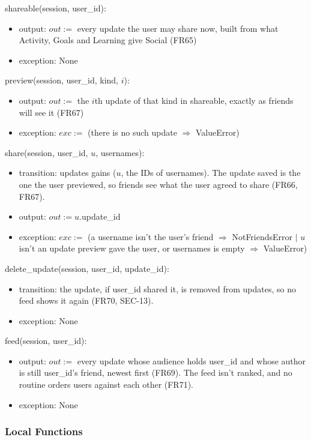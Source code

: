 \documentclass[12pt, titlepage]{article}
\begin{document}
\noindent shareable(session, user\_id):
\begin{itemize}
\item output: $out :=$ every update the user may share now, built from what
  Activity, Goals and Learning give Social (FR65)
\item exception: None
\end{itemize}

\noindent preview(session, user\_id, kind, $i$):
\begin{itemize}
\item output: $out :=$ the $i$th update of that kind in shareable, exactly as
  friends will see it (FR67)
\item exception: $exc :=$ (there is no such update $\Rightarrow$ ValueError)
\end{itemize}

\noindent share(session, user\_id, $u$, usernames):
\begin{itemize}
\item transition: updates gains ($u$, the IDs of usernames). The update saved
  is the one the user previewed, so friends see what the user agreed to share
  (FR66, FR67).
\item output: $out := u$.update\_id
\item exception: $exc :=$ (a username isn't the user's friend $\Rightarrow$
  NotFriendsError $|$ $u$ isn't an update preview gave the user, or usernames
  is empty $\Rightarrow$ ValueError)
\end{itemize}

\noindent delete\_update(session, user\_id, update\_id):
\begin{itemize}
\item transition: the update, if user\_id shared it, is removed from updates,
  so no feed shows it again (FR70, SEC-13).
\item exception: None
\end{itemize}

\noindent feed(session, user\_id):
\begin{itemize}
\item output: $out :=$ every update whose audience holds user\_id and whose
  author is still user\_id's friend, newest first (FR69). The feed isn't
  ranked, and no routine orders users against each other (FR71).
\item exception: None
\end{itemize}

\subsubsection{Local Functions}
\end{document}
